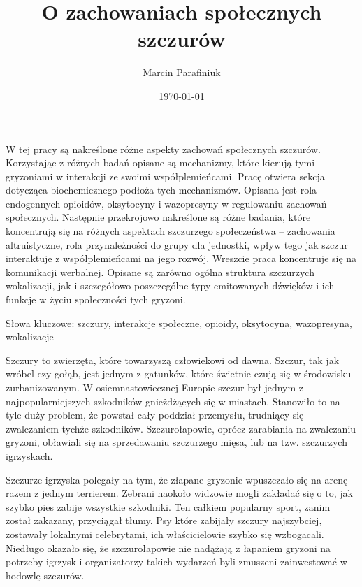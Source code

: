 \documentclass{psychol}
\title{O zachowaniach społecznych szczurów}
\author{Marcin Parafiniuk}
\date{\today}
\begin{document}
\maketitle
\tableofcontents
\doublespacing

\pagebreak


W tej pracy są nakreślone różne aspekty zachowań społecznych szczurów. Korzystając z różnych badań \colorbox{yellow!30}{opisane są} mechanizmy, które kierują tymi gryzoniami w interakcji ze swoimi współplemieńcami. \colorbox{yellow!30}{Pracę otwiera sekcja} dotycząca biochemicznego podłoża tych mechanizmów. \colorbox{yellow!30}{Opisana jest} rola endogennych opioidów, oksytocyny i wazopresyny w regulowaniu zachowań społecznych. Następnie przekrojowo \colorbox{yellow!30}{nakreślone są} różne badania, które koncentrują się na różnych aspektach szczurzego społeczeństwa -- zachowania altruistyczne, rola przynależności do grupy dla jednostki, wpływ tego jak szczur interaktuje z współplemieńcami na jego rozwój. Wreszcie \colorbox{yellow!30}{praca koncentruje się} na komunikacji werbalnej. \colorbox{yellow!30}{Opisane są} zarówno ogólna struktura szczurzych wokalizacji, jak i szczegółowo poszczególne typy emitowanych dźwięków i ich funkcje w życiu społeczności tych gryzoni.

Słowa kluczowe: szczury, interakcje społeczne, opioidy, oksytocyna, wazopresyna, wokalizacje


Szczury to zwierzęta, które towarzyszą człowiekowi od dawna. Szczur, tak jak wróbel czy gołąb, jest jednym z gatunków, które świetnie czują się w środowisku zurbanizowanym. W osiemnastowiecznej Europie szczur był jednym z najpopularniejszych szkodników gnieżdżących się w miastach. Stanowiło to na tyle duży problem, że powstał cały poddział przemysłu, trudniący się zwalczaniem tychże szkodników. Szczurołapowie, oprócz zarabiania na zwalczaniu gryzoni, obławiali się na sprzedawaniu szczurzego mięsa, lub na tzw. szczurzych igrzyskach.

Szczurze igrzyska polegały na tym, że złapane gryzonie wpuszczało się na arenę razem z jednym terrierem. Zebrani naokoło widzowie mogli zakładać się o to, jak szybko pies zabije wszystkie szkodniki. Ten całkiem popularny sport, zanim został zakazany, przyciągał tłumy. Psy które zabijały szczury najszybciej, zostawały lokalnymi celebrytami, ich właścicielowie szybko się wzbogacali. Niedługo okazało się, że szczurołapowie nie nadążają z łapaniem gryzoni na potrzeby igrzysk i organizatorzy takich wydarzeń byli zmuszeni zainwestować w hodowlę szczurów.
\end{document}
